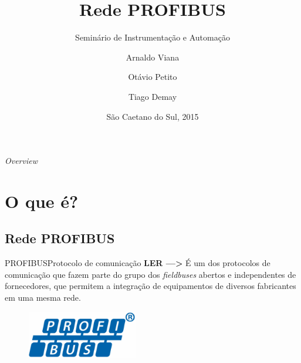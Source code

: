 \documentclass{beamer}
\title[Rede PROFIBUS] %
{Rede PROFIBUS}
\subtitle
{Seminário de Instrumentação e Automação}
\author[Arnaldo Viana, Otávio Petito, Tiago Demay] %
{Arnaldo Viana\inst{1} \and Otávio Petito\inst{2} \and Tiago Demay\inst{3}}
\institute[Escola de Engenharia Mauá] %
{
  \inst{1}%
  RA 09.01746-0\\
  6º Ano - Noturno
  \and
  \inst{2}%
  RA 08.1453-0\\
  6º Ano - Noturno
  \and
  \inst{3}%
  RA 09.02270-8\\
  6º Ano - Noturno
  }
\date[SCS 2015] %
{São Caetano do Sul, 2015}
\begin{document}
\begin{frame}
  \titlepage
\end{frame}

\begin{frame}{\textit{Overview}}
  \tableofcontents
\end{frame}





\section{O que é?}

\subsection{Rede PROFIBUS}

\begin{frame}{PROFIBUS}{Protocolo de comunicação}
\textbf{LER --->}
  É um dos protocolos de comunicação que fazem parte do grupo dos \textit{fieldbuses} abertos e independentes de fornecedores, que permitem a integração de equipamentos de diversos fabricantes em uma mesma rede.
  
  \begin{figure}
  	\centering
  	\includegraphics[scale=0.8]{figs/profibus.png} 
  \end{figure}
  
\end{frame}
\end{document}
